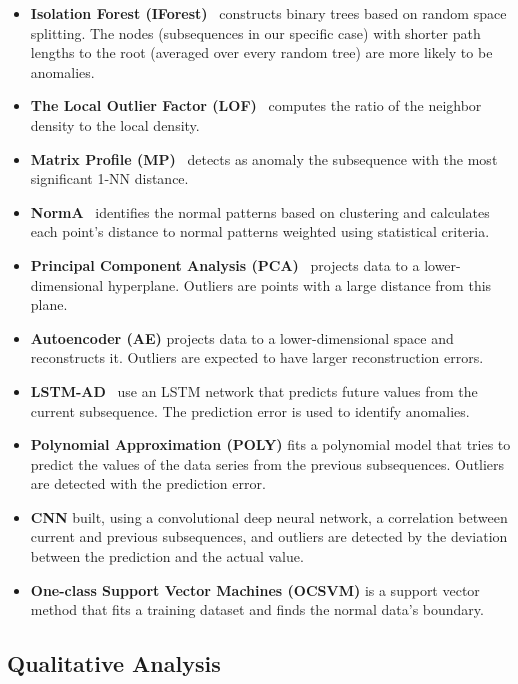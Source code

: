 \begin{itemize}
\item {\bf Isolation Forest (IForest)}~\cite{liu_isolation_2008} constructs binary trees based on random space splitting. The nodes (subsequences in our specific case) with shorter path lengths to the root (averaged over every random tree) are more likely to be anomalies. 
\item {\bf The Local Outlier Factor (LOF)}~\cite{breunig_lof_2000} computes the ratio of the neighbor density to the local density. 
\item {\bf Matrix Profile (MP)}~\cite{yeh_time_2018} detects as anomaly the subsequence with the most significant 1-NN distance. 
\item {\bf NormA}~\cite{boniol_unsupervised_2021} identifies the normal patterns based on clustering and calculates each point's distance to normal patterns weighted using statistical criteria. 
\item {\bf Principal Component Analysis (PCA)}~\cite{aggarwal_outlier_2017} projects data to a lower-dimensional hyperplane. Outliers are points with a large distance from this plane. 
\item {\bf Autoencoder (AE)} \cite{10.1145/2689746.2689747} projects data to a lower-dimensional space and reconstructs it. Outliers are expected to have larger reconstruction errors. 
\item {\bf LSTM-AD}~\cite{malhotra_long_2015} use an LSTM network that predicts future values from the current subsequence. The prediction error is used to identify anomalies.
\item {\bf Polynomial Approximation (POLY)} \cite{li_unifying_2007} fits a polynomial model that tries to predict the values of the data series from the previous subsequences. Outliers are detected with the prediction error. 
\item {\bf CNN} \cite{8581424} built, using a convolutional deep neural network, a correlation between current and previous subsequences, and outliers are detected by the deviation between the prediction and the actual value. 
\item {\bf One-class Support Vector Machines (OCSVM)} \cite{scholkopf_support_1999} is a support vector method that fits a training dataset and finds the normal data's boundary.
\end{itemize}

\subsection{Qualitative Analysis}
\label{exp:qual}



